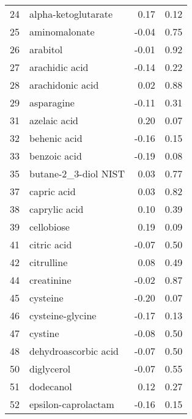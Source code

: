 \begin{tabular}{llrr}
24  &                alpha-ketoglutarate &                 0.17 &     0.12 \\
25  &                      aminomalonate &                -0.04 &     0.75 \\
26  &                           arabitol &                -0.01 &     0.92 \\
27  &                     arachidic acid &                -0.14 &     0.22 \\
28  &                   arachidonic acid &                 0.02 &     0.88 \\
29  &                         asparagine &                -0.11 &     0.31 \\
31  &                       azelaic acid &                 0.20 &     0.07 \\
32  &                       behenic acid &                -0.16 &     0.15 \\
33  &                       benzoic acid &                -0.19 &     0.08 \\
35  &               butane-2\_3-diol NIST &                 0.03 &     0.77 \\
37  &                        capric acid &                 0.03 &     0.82 \\
38  &                      caprylic acid &                 0.10 &     0.39 \\
39  &                         cellobiose &                 0.19 &     0.09 \\
41  &                        citric acid &                -0.07 &     0.50 \\
42  &                         citrulline &                 0.08 &     0.49 \\
44  &                         creatinine &                -0.02 &     0.87 \\
45  &                           cysteine &                -0.20 &     0.07 \\
46  &                   cysteine-glycine &                -0.17 &     0.13 \\
47  &                            cystine &                -0.08 &     0.50 \\
48  &               dehydroascorbic acid &                -0.07 &     0.50 \\
50  &                         diglycerol &                -0.07 &     0.55 \\
51  &                          dodecanol &                 0.12 &     0.27 \\
52  &                epsilon-caprolactam &                -0.16 &     0.15 \\

\end{tabular}
